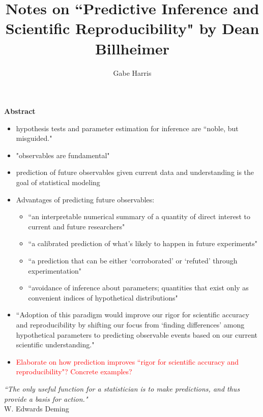 \documentclass[12pt, a4paper]{article}
\begin{document}
% 
% 





\title{Notes on ``Predictive Inference and Scientific Reproducibility" by Dean Billheimer}
\author{\Large Gabe Harris}
\maketitle

\textbf{Abstract}\\
\begin{itemize}
  \item hypothesis tests and parameter estimation for inference are ``noble, but misguided."
  \item "observables are fundamental"
  \item prediction of future observables given current data and understanding is the goal of statistical modeling
  \item Advantages of predicting future observables:
    \begin{itemize}
      \item ``an interpretable numerical summary of a quantity of direct interest to current and future researchers"
      \item ``a calibrated prediction of what's likely to happen in future experiments"
      \item ``a prediction that can be either `corroborated' or `refuted' through experimentation"
      \item ``avoidance of inference about parameters; quantities that exist only as convenient indices of hypothetical distributions"
    \end{itemize}
  \item ``Adoption of this paradigm would improve our rigor for scientific accuracy and reproducibility by shifting our focus from `finding differences' among hypothetical parameters to predicting observable events based on our current scientific understanding."
  \item \textcolor{red}{Elaborate on how prediction improves ``rigor for scientific accuracy and reproducibility"?  Concrete examples?}
\end{itemize}

\textit{``The only useful function for a statistician is to make predictions, and thus provide a basis for action."}\\
W. Edwards Deming\\
\end{document}
